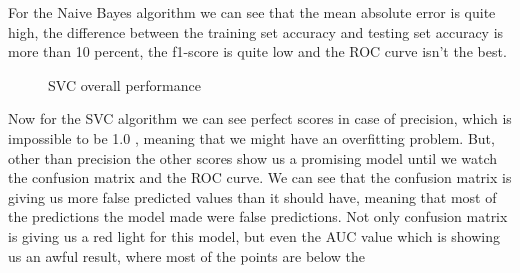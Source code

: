 For the Naive Bayes algorithm we can see that the mean absolute error is quite high, the
difference between the training set accuracy and testing set accuracy is more than 10 percent, the f1-score
is quite low and the ROC curve isn't the best.
\\[5pt]
\begin{figure}[H]
	\centering
	\hspace{5pt}
	\hspace{5pt}
	\caption{SVC overall performance}
	\label{fig:svc_perf}
\end{figure}
Now for the SVC algorithm we can see perfect scores in case of precision, which is impossible to be 1.0
, meaning that we might have an overfitting problem. But, other than precision the other scores show us a promising
model until we watch the confusion matrix and the ROC curve. We can see that the confusion matrix is giving us more false predicted
values than it should have, meaning that most of the predictions the model made were false predictions. Not only confusion matrix is
giving us a red light for this model, but even the AUC value which is showing us an awful result, where most of the points are below the
